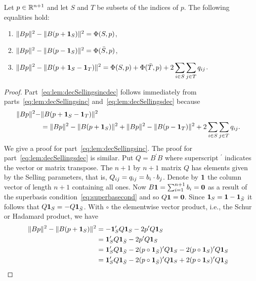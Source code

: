 \documentclass[final,leqno]{siamltex}
\begin{document}
\begin{lemma}\label{lem:decSellings}
Let $p \in {\mathbb R}^{n+1}$ and let $S$ and $T$ be subsets of the indices of $p$.  The following equalities hold:
\begin{enumerate}
\item  $\|Bp\|^2 - \|B(p + \boldsymbol{1}_S)\|^2 = \Phi(S, p)$, \label{eq:lem:decSellingsinc}
\item  $\|Bp\|^2 - \|B(p - \boldsymbol{1}_S)\|^2 = \Phi(\bar{S}, p)$, \label{eq:lem:decSellingsdec}
\item  ${\displaystyle \|Bp\|^2 - \|B(p + \boldsymbol{1}_S - \boldsymbol{1}_T)\|^2 = \Phi(S, p) + \Phi(\bar{T},p) + 2\sum_{i\in S}\sum_{j\in T} q_{ij} }$.  \label{eq:lem:decSellingsincdec}
\end{enumerate}
\end{lemma}
\begin{proof}
Part~\ref{eq:lem:decSellingsincdec} follows immediately from parts~\ref{eq:lem:decSellingsinc} and~\ref{eq:lem:decSellingsdec} because
\begin{align*}
\|Bp\|^2 - &\|B(p + \boldsymbol{1}_S - \boldsymbol{1}_T)\|^2 \\
&= \|Bp\|^2-\|B(p + \boldsymbol{1}_S)\|^2 +  \|Bp\|^2-\|B(p - \boldsymbol{1}_T)\|^2 + 2\sum_{i\in S}\sum_{j\in T} q_{ij}.
\end{align*}
We give a proof for part~\ref{eq:lem:decSellingsinc}.  The proof for part~\ref{eq:lem:decSellingsdec} is similar.  
Put $Q = B^\prime B$ where superscript $^\prime$ indicates the vector or matrix transpose.  The $n+1$ by $n+1$ matrix $Q$ has elements given by the Selling parameters, that is, $Q_{ij} = q_{ij}=b_i \cdot b_j$.  Denote by $\boldsymbol{1}$ the column vector of length $n+1$ containing all ones.  Now $B\boldsymbol{1} = \sum_{i=1}^{n+1}b_i = \boldsymbol{0}$ as a result of the superbasis condition~\eqref{eq:superbasecond} and so $Q\boldsymbol{1} = \boldsymbol{0}$.  Since $\boldsymbol{1}_S = \boldsymbol{1} - \boldsymbol{1}_{\bar{S}}$ it follows that $Q\boldsymbol{1}_S = -Q\boldsymbol{1}_{\bar{S}}$.  With $\circ$ the elementwise vector product, i.e., the Schur or Hadamard product, we have
 \begin{align*}
 \|Bp\|^2 - \|B(p + \onebf_S)\|^2 &= -\onebf^\prime_S Q \onebf_S - 2 p^\prime Q \onebf_S \\
 &= \onebf^\prime_S Q \onebf_{\bar{S}} - 2 p^\prime Q \onebf_S \\
&= \onebf^\prime_S Q \onebf_{\bar{S}} - 2 (p\circ\onebf_{\bar{S}})^\prime Q \onebf_S - 2 (p\circ\onebf_S)^\prime Q \onebf_S \\
&= \onebf^\prime_S Q \onebf_{\bar{S}} - 2 (p\circ\onebf_{\bar{S}})^\prime Q \onebf_{S} + 2 (p\circ\onebf_S)^\prime Q \onebf_{\bar{S}}

\end{align*}
\end{proof}
\end{document}
